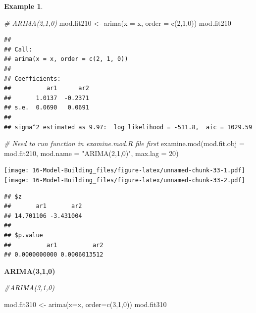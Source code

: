 \documentclass[
]{book}
\newenvironment{Shaded}{\begin{snugshade}}{\end{snugshade}}
\newcommand{\AttributeTok}[1]{\textcolor[rgb]{0.77,0.63,0.00}{#1}}
\newcommand{\CommentTok}[1]{\textcolor[rgb]{0.56,0.35,0.01}{\textit{#1}}}
\newcommand{\DecValTok}[1]{\textcolor[rgb]{0.00,0.00,0.81}{#1}}
\newcommand{\FunctionTok}[1]{\textcolor[rgb]{0.00,0.00,0.00}{#1}}
\newcommand{\NormalTok}[1]{#1}
\newcommand{\OtherTok}[1]{\textcolor[rgb]{0.56,0.35,0.01}{#1}}
\newcommand{\StringTok}[1]{\textcolor[rgb]{0.31,0.60,0.02}{#1}}
\theoremstyle{definition}
\theoremstyle{definition}
\newtheorem{example}{Example}[chapter]
\theoremstyle{definition}
\theoremstyle{definition}
\theoremstyle{remark}
\begin{document}
\begin{example}
\begin{Shaded}
\begin{Highlighting}[]
\CommentTok{\# ARIMA(2,1,0)}
\NormalTok{mod.fit210 }\OtherTok{\textless{}{-}} \FunctionTok{arima}\NormalTok{(}\AttributeTok{x =}\NormalTok{ x, }\AttributeTok{order =} \FunctionTok{c}\NormalTok{(}\DecValTok{2}\NormalTok{,}\DecValTok{1}\NormalTok{,}\DecValTok{0}\NormalTok{))}
\NormalTok{mod.fit210}
\end{Highlighting}
\end{Shaded}

\begin{verbatim}
## 
## Call:
## arima(x = x, order = c(2, 1, 0))
## 
## Coefficients:
##          ar1      ar2
##       1.0137  -0.2371
## s.e.  0.0690   0.0691
## 
## sigma^2 estimated as 9.97:  log likelihood = -511.8,  aic = 1029.59
\end{verbatim}

\begin{Shaded}
\begin{Highlighting}[]
\CommentTok{\# Need to run function in examine.mod.R file first}
\FunctionTok{examine.mod}\NormalTok{(}\AttributeTok{mod.fit.obj =}\NormalTok{ mod.fit210, }\AttributeTok{mod.name =} \StringTok{"ARIMA(2,1,0)"}\NormalTok{, }\AttributeTok{max.lag =} \DecValTok{20}\NormalTok{)}
\end{Highlighting}
\end{Shaded}

\texttt{[image: 16-Model-Building\_files/figure-latex/unnamed-chunk-33-1.pdf]} \texttt{[image: 16-Model-Building\_files/figure-latex/unnamed-chunk-33-2.pdf]}

\begin{verbatim}
## $z
##       ar1       ar2 
## 14.701106 -3.431004 
## 
## $p.value
##          ar1          ar2 
## 0.0000000000 0.0006013512
\end{verbatim}

\textbf{ARIMA(3,1,0)}

\begin{Shaded}
\begin{Highlighting}[]
\CommentTok{\#ARIMA(3,1,0)}

\NormalTok{mod.fit310 }\OtherTok{\textless{}{-}} \FunctionTok{arima}\NormalTok{(}\AttributeTok{x=}\NormalTok{x, }\AttributeTok{order=}\FunctionTok{c}\NormalTok{(}\DecValTok{3}\NormalTok{,}\DecValTok{1}\NormalTok{,}\DecValTok{0}\NormalTok{))}
\NormalTok{mod.fit310}
\end{Highlighting}
\end{Shaded}


\end{example}
\end{document}
